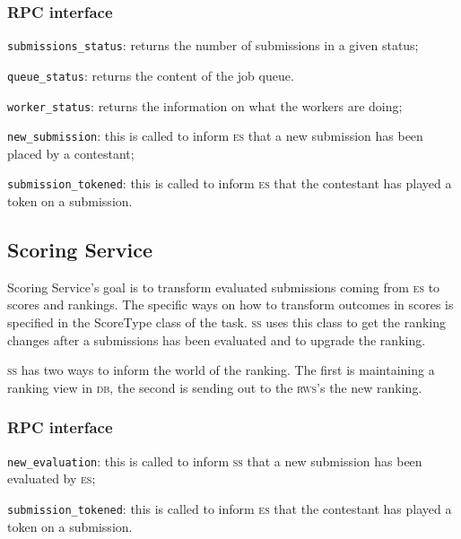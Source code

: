 \documentclass[a4paper,8pt]{amsart}
\newcommand{\DB}{\textsc{db}}
\newcommand{\ES}{\textsc{es}}
\renewcommand{\SS}{\textsc{ss}}
\newcommand{\RWS}{\textsc{rws}}
\newenvironment{squishlist}{%
  \begin{list}{\textbullet}%
    { \setlength{\itemsep}{0pt}%
      \setlength{\parsep}{3pt}%
      \setlength{\topsep}{3pt}%
      \setlength{\partopsep}{0pt}%
      \setlength{\leftmargin}{1.5em}%
      \setlength{\labelwidth}{1em}%
      \setlength{\labelsep}{0.5em} }%
}{\end{list}}
\newcommand{\id}[1]{\texttt{#1}}
\begin{document}
\begin{multicols}{2}
  \subsubsection{RPC interface}

  \begin{squishlist}
  \item \id{submissions\_status}: returns the number of submissions in
    a given status;
  \item \id{queue\_status}: returns the content of the job queue.
  \item \id{worker\_status}: returns the information on what the
    workers are doing;
  \item \id{new\_submission}: this is called to inform \ES{} that a new
    submission has been placed by a contestant;
  \item \id{submission\_tokened}: this is called to inform \ES{} that
    the contestant has played a token on a submission.
  \end{squishlist}

  \subsection{Scoring Service}

  Scoring Service's goal is to transform evaluated submissions coming
  from \ES{} to scores and rankings. The specific ways on how to
  transform outcomes in scores is specified in the ScoreType class of
  the task. \SS{} uses this class to get the ranking changes after a
  submissions has been evaluated and to upgrade the ranking.

  \SS{} has two ways to inform the world of the ranking. The first is
  maintaining a ranking view in \DB{}, the second is sending out to
  the \RWS{}'s the new ranking.

  \subsubsection{RPC interface}

  \begin{squishlist}
  \item \id{new\_evaluation}: this is called to inform \SS{} that a
    new submission has been evaluated by \ES{};
  \item \id{submission\_tokened}: this is called to inform \ES{} that
    the contestant has played a token on a submission.
  \end{squishlist}


\end{multicols}
\end{document}
